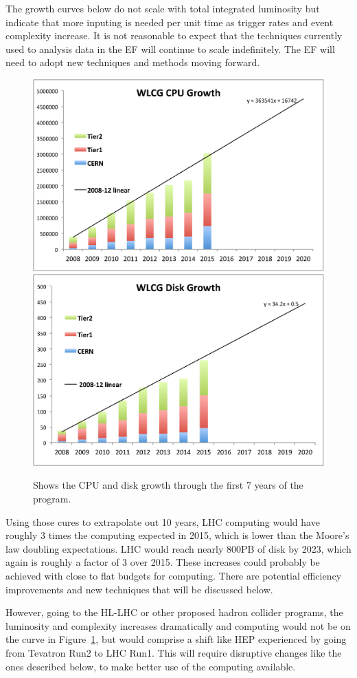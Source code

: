 The growth curves below do not scale
with total integrated luminosity but indicate that more inputing is
needed per unit time as trigger rates and event complexity increase.
It is not reasonable to expect that the techniques currently used to
analysis data in the EF will continue to scale
indefinitely.  The EF will need to adopt new techniques
and methods moving forward.

\begin{figure}[htb]
\begin{center}
\includegraphics[width=0.45\hsize]{CpF-E2/Growth1.eps}
\includegraphics[width=0.45\hsize]{CpF-E2/Growth2.eps}
\caption{Shows the CPU and disk growth through the first 7 years of the program.}
\label{fig:growth}
\end{center}
\end{figure}


Using those cures to extrapolate out 10 years,  LHC computing would have
roughly 3 times the computing expected in 2015, which is lower than the
Moore's law doubling expectations.  LHC would reach nearly 800PB of disk by
2023, which again is roughly a factor of 3 over 2015.   These increases could
probably be achieved with close to flat budgets for computing.   There are
potential efficiency improvements and new techniques that will be discussed
below.

However, going to the HL-LHC or other proposed hadron collider programs,  the
luminosity and complexity increases dramatically and computing would not be on
the curve in Figure~\ref{fig:growth}, but would comprise a shift like HEP
experienced by going from Tevatron Run2 to LHC Run1.
This will require disruptive changes like the ones described  below, to make
better use of the computing available.


